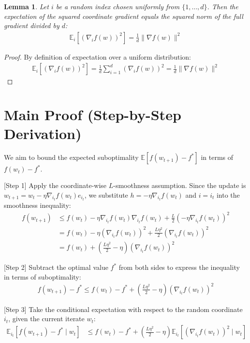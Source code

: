 \documentclass{article}
\newtheorem{lemma}[theorem]{Lemma}
\begin{document}
\begin{lemma}
Let $i$ be a random index chosen uniformly from $\{1, \dots, d\}$. Then the expectation of the squared coordinate gradient equals the squared norm of the full gradient divided by $d$:
\begin{align*}
\mathbb{E}_i \left[ (\nabla_i f(w))^2 \right] = \frac{1}{d} \|\nabla f(w)\|^2
\end{align*}
\end{lemma}
\begin{proof}
By definition of expectation over a uniform distribution:
\begin{align*}
\mathbb{E}_i \left[ (\nabla_i f(w))^2 \right] = \frac{1}{d} \sum_{i=1}^d (\nabla_i f(w))^2 = \frac{1}{d} \|\nabla f(w)\|^2
\end{align*}
\end{proof}

\section*{Main Proof (Step-by-Step Derivation)}
We aim to bound the expected suboptimality $\mathbb{E}[f(w_{t+1}) - f^*]$ in terms of $f(w_t) - f^*$.

[Step 1] Apply the coordinate-wise $L$-smoothness assumption. Since the update is $w_{t+1} = w_t - \eta \nabla_{i_t} f(w_t) e_{i_t}$, we substitute $h = -\eta \nabla_{i_t} f(w_t)$ and $i = i_t$ into the smoothness inequality:
\begin{align*}
f(w_{t+1}) &\leq f(w_t) - \eta \nabla_{i_t} f(w_t) \nabla_{i_t} f(w_t) + \frac{L}{2} \left( -\eta \nabla_{i_t} f(w_t) \right)^2 \\
&= f(w_t) - \eta (\nabla_{i_t} f(w_t))^2 + \frac{L \eta^2}{2} (\nabla_{i_t} f(w_t))^2 \\
&= f(w_t) + \left( \frac{L \eta^2}{2} - \eta \right) (\nabla_{i_t} f(w_t))^2
\end{align*}

[Step 2] Subtract the optimal value $f^*$ from both sides to express the inequality in terms of suboptimality:
\begin{align*}
f(w_{t+1}) - f^* \leq f(w_t) - f^* + \left( \frac{L \eta^2}{2} - \eta \right) (\nabla_{i_t} f(w_t))^2
\end{align*}

[Step 3] Take the conditional expectation with respect to the random coordinate $i_t$, given the current iterate $w_t$:
\begin{align*}
\mathbb{E}_{i_t} [f(w_{t+1}) - f^* \mid w_t] &\leq f(w_t) - f^* + \left( \frac{L \eta^2}{2} - \eta \right) \mathbb{E}_{i_t} \left[ (\nabla_{i_t} f(w_t))^2 \mid w_t \right]
\end{align*}
\end{document}
